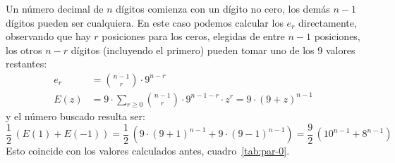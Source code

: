 \begin{example}
    Un número decimal de \(n\) dígitos
    comienza con un dígito no cero,
    los demás \(n - 1\) dígitos pueden ser cualquiera.
    En este caso podemos calcular los \(e_r\) directamente,
    observando que hay \(r\) posiciones para los ceros,
    elegidas de entre \(n - 1\) posiciones,
    los otros \(n - r\) dígitos
    (incluyendo el primero)
    pueden tomar uno de los \(9\) valores restantes:
    \begin{align*}
      e_r
	&= \binom{n - 1}{r} \cdot 9^{n - r} \\
      E(z)
	&= 9 \cdot \sum_{r \ge 0}
		     \binom{n - 1}{r} \cdot 9^{n - 1 - r} \cdot z^r
	 = 9 \cdot (9 + z)^{n - 1}
    \end{align*}
    y el número buscado resulta ser:
    \begin{equation*}
      \frac{1}{2} \, \left( E(1) + E(-1) \right)
	= \frac{1}{2} \, \left(
		     9 \cdot (9 + 1)^{n - 1}
		       + 9 \cdot (9 - 1)^{n - 1}
		  \right)
	= \frac{9}{2} \, \left(10^{n - 1} + 8^{n - 1}\right)
    \end{equation*}
    Esto coincide con los valores calculados antes,
    cuadro~\ref{tab:par-0}.
  \end{example}

